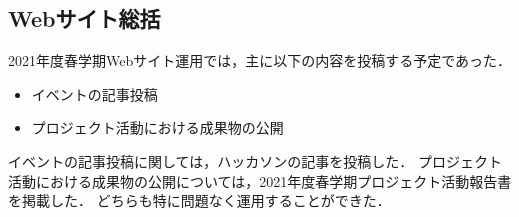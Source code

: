 \subsection*{Webサイト総括}


2021年度春学期Webサイト運用では，主に以下の内容を投稿する予定であった．

\begin{itemize}
\item イベントの記事投稿
\item プロジェクト活動における成果物の公開
\end{itemize}

イベントの記事投稿に関しては，ハッカソンの記事を投稿した．
プロジェクト活動における成果物の公開については，2021年度春学期プロジェクト活動報告書を掲載した．
どちらも特に問題なく運用することができた．